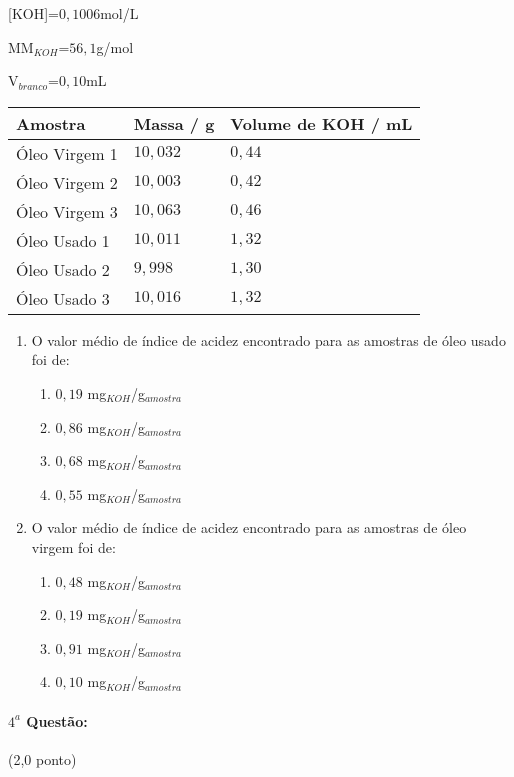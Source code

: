 \documentclass[12pt,a4paper]{article}
\begin{document}
[KOH]=$0,1006$mol/L

MM$_{KOH}$=$56,1$g/mol

V$_{branco}$=$0,10$mL

\begin{center}
\begin{tabular}{|l|l|l|}
\hline 
Amostra & Massa / g & Volume de KOH / mL \\ \hline
Óleo Virgem 1 & $10,032$ & $0,44$ \\ \hline
Óleo Virgem 2 & $10,003$ & $0,42$ \\ \hline
Óleo Virgem 3 & $10,063$ & $0,46$ \\ \hline
Óleo Usado 1 & $10,011$ & $1,32$ \\ \hline
Óleo Usado 2 & $9,998$ & $1,30$ \\ \hline
Óleo Usado 3 & $10,016$ & $1,32$ \\ \hline
\end{tabular}
\end{center}

\begin{enumerate}[label=\Roman*]

\item O valor médio de índice de acidez encontrado para as amostras de óleo usado foi de:
\begin{enumerate}[label=\alph*)]
\item $0,19$ mg$_{KOH}$/g$_{amostra}$
\item $0,86$ mg$_{KOH}$/g$_{amostra}$
\item $0,68$ mg$_{KOH}$/g$_{amostra}$
\item $0,55$ mg$_{KOH}$/g$_{amostra}$
\end{enumerate}

\item O valor médio de índice de acidez encontrado para as amostras de óleo virgem foi de:
\begin{enumerate}[label=\alph*)]
\item $0,48$ mg$_{KOH}$/g$_{amostra}$
\item $0,19$ mg$_{KOH}$/g$_{amostra}$
\item $0,91$ mg$_{KOH}$/g$_{amostra}$
\item $0,10$ mg$_{KOH}$/g$_{amostra}$
\end{enumerate}
\end{enumerate}

\paragraph{$4^a$ Questão:} (2,0 ponto)
\end{document}
